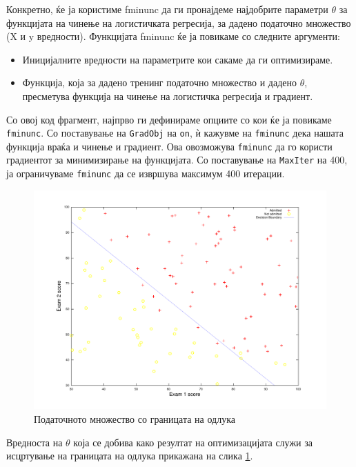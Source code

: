 Конкретно, ќе ја користиме fminunc да ги пронајдеме најдобрите параметри
$\theta$ за функцијата на чинење на логистичката регресија, за дадено податочно
множество (X и y вредности). Функцијата fminunc ќе ја повикаме со следните
аргументи:
\begin{itemize}
  \item Иницијалните вредности на параметрите кои сакаме да ги оптимизираме.
  \item Функција, која за дадено тренинг податочно множество и дадено $\theta$,
  пресметува функција на чинење на логистичка регресија и градиент.
\end{itemize}



Со овој код фрагмент, најпрво ги дефинираме опциите со кои ќе ја повикаме
\texttt{fminunc}. Со поставување на \texttt{GradObj} на \texttt{on}, ѝ
кажувме на \texttt{fminunc} дека нашата функција враќа и чинење и градиент.
Ова овозможува \texttt{fminunc} да го користи градиентот за минимизирање на
функцијата. Со поставување на \texttt{MaxIter} на 400, ја ограничуваме
\texttt{fminunc} да се извршува максимум 400 итерации.

\begin{figure}[htb]
\centering
\includegraphics[width=.9\textwidth]{src/logisticRegression/decisionBoundary}
\caption{Податочното множество со границата на одлука}
\label{fig:decisionBoundary}
\end{figure}

Вредноста на $\theta$ која се добива како резултат на оптимизацијата служи за
исцртување на границата на одлука прикажана на слика \ref{fig:decisionBoundary}.

